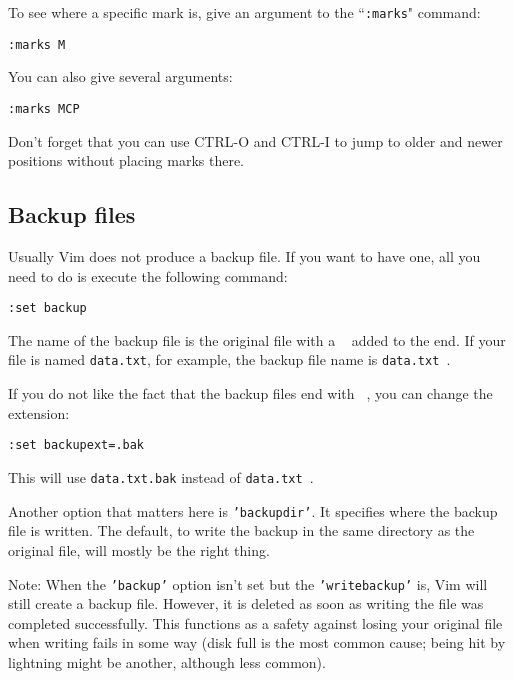 To see where a specific mark is, give an argument to the ``\texttt{:marks}" command:

 \begin{Verbatim}[samepage=true]
 :marks M
 \end{Verbatim}

You can also give several arguments:

 \begin{Verbatim}[samepage=true]
 :marks MCP
 \end{Verbatim}

Don't forget that you can use CTRL-O and CTRL-I to jump to older and newer positions without placing marks there.

\subsection{Backup files}
\label{Backup files}
Usually Vim does not produce a backup file.
If you want to have one, all you need to do is execute the following command:

 \begin{Verbatim}[samepage=true]
 :set backup
 \end{Verbatim}

The name of the backup file is the original file with a  \texttt{~}  added to the end.
If your file is named \texttt{data.txt}, for example, the backup file name is \texttt{data.txt~}.

If you do not like the fact that the backup files end with \texttt{~}, you can change the extension:

 \begin{Verbatim}[samepage=true]
 :set backupext=.bak
 \end{Verbatim}

This will use \texttt{data.txt.bak} instead of \texttt{data.txt~}.

Another option that matters here is \texttt{'backupdir'}.
It specifies where the backup file is written.
The default, to write the backup in the same directory as the original file, will mostly be the right thing.

Note: When the \texttt{'backup'} option isn't set but the \texttt{'writebackup'} is, Vim will still create a backup file.
However, it is deleted as soon as writing the file was completed successfully.
This functions as a safety against losing your original file when writing fails in some way (disk full is the most common cause; being hit by lightning might be another, although less common).

